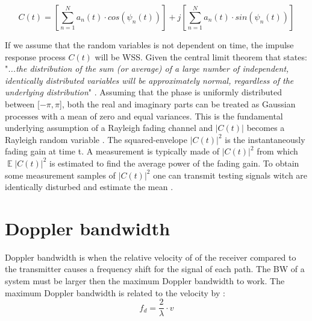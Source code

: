 \begin{equation}\label{eq:inf_reyl_impulse_response}
C(t) = \left [ \sum_{n =1}^{N} a_n(t)\cdot cos(\psi_n (t))\right ] + j\left [\sum_{n =1}^{N} a_n(t)\cdot sin(\psi_n (t))  \right ]
\end{equation}
\begin{where}
\end{where}

If we assume that the random variables is not dependent on time, the impulse response process $C(t)$ will be \gls{WSS}. Given the central limit theorem that states:
"\textit{...the distribution of the sum (or average) of a large number of independent, identically distributed variables will be approximately normal, regardless of the underlying distribution}" \citep{CentralLimit}.  
Assuming that the phase is uniformly distributed between [$-\pi,\pi$], both the real and imaginary parts can be treated as Gaussian processes with a mean of zero and equal variances. This is the fundamental underlying assumption of a Rayleigh fading channel and $ \left | C(t) \right | $ becomes a Rayleigh random variable \citep[p. 589]{Wireless_CommunicationsBook}. The squared-envelope $ \left | C(t) \right |^2 $ is the instantaneously fading gain at time t. A measurement is typically made of $ \left | C(t) \right |^2 $ from which $ \mathop{\mathbb{E}}\left | C(t) \right |^2 $ is estimated to find the average power of the fading gain. To obtain some measurement samples of $ \left | C(t) \right |^2 $ one can transmit testing signals witch are identically disturbed and estimate the mean \citep{MeasurementComplexRay}.




\section{Doppler bandwidth}
Doppler bandwidth is when the relative velocity of of the receiver compared to the transmitter causes a frequency shift for the signal of each path. The \gls{BW} of a system must be larger then the maximum Doppler bandwidth to work. The maximum Doppler bandwidth is related to the velocity by \citep[p. 229]{Wireless_CommunicationsBook}:
\begin{equation}\label{eq:Doppler}
f_d = \frac{2}{\lambda} \cdot v
\end{equation}
\begin{where}
\end{where}

